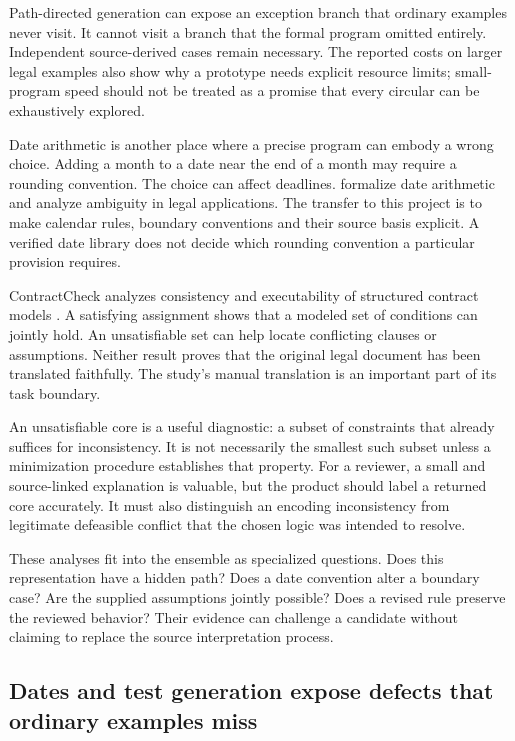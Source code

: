 \documentclass[12pt,a4paper,oneside,openany]{book}
\begin{document}
Path-directed generation can expose an exception branch that ordinary
examples never visit. It cannot visit a branch that the formal program
omitted entirely. Independent source-derived cases remain necessary. The
reported costs on larger legal examples also show why a prototype needs
explicit resource limits; small-program speed should not be treated as a
promise that every circular can be exhaustively explored.

Date arithmetic is another place where a precise program can embody a wrong
choice. Adding a month to a date near the end of a month may require a
rounding convention. The choice can affect deadlines. \citet{dates2024}
formalize date arithmetic and analyze ambiguity in legal applications. The
transfer to this project is to make calendar rules, boundary conventions and
their source basis explicit. A verified date library does not decide which
rounding convention a particular provision requires.

ContractCheck analyzes consistency and executability of structured contract
models \citep[secs.~3--8]{contractcheck2025}. A satisfying assignment shows
that a modeled set of conditions can jointly hold. An unsatisfiable set can
help locate conflicting clauses or assumptions. Neither result proves that
the original legal document has been translated faithfully. The study's
manual translation is an important part of its task boundary.

An unsatisfiable core is a useful diagnostic: a subset of constraints that
already suffices for inconsistency. It is not necessarily the smallest such
subset unless a minimization procedure establishes that property. For a
reviewer, a small and source-linked explanation is valuable, but the product
should label a returned core accurately. It must also distinguish an
encoding inconsistency from legitimate defeasible conflict that the chosen
logic was intended to resolve.

These analyses fit into the ensemble as specialized questions. Does this
representation have a hidden path? Does a date convention alter a boundary
case? Are the supplied assumptions jointly possible? Does a revised rule
preserve the reviewed behavior? Their evidence can challenge a candidate
without claiming to replace the source interpretation process.

\subsection{Dates and test generation expose defects that ordinary examples miss}
\label{merge:P-02-literature:03}
\end{document}
